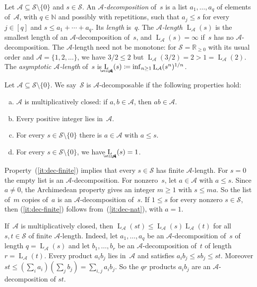 \documentclass[11pt,letterpaper]{article}
\DeclareMathOperator{\declength}{L}
\DeclareMathOperator{\asympdeclength}{\underaccent{\wtilde}{L}}
\newcommand{\RR}{\mathbb{R}}
\newcommand{\NN}{\mathbb{N}}
\begin{document}
Let $\mathcal{A} \subseteq \mathcal{S} \setminus \{0\}$ and $s \in \mathcal{S}$. An \emph{$\mathcal{A}$-decomposition} of~$s$ is a list $a_1, \ldots, a_q$ of elements of~$\mathcal{A}$, with $q \in \NN$ and possibly with repetitions, such that $a_j \leq s$ for every $j \in [q]$ and $s \leq a_1 + \cdots + a_q$. Its \emph{length} is~$q$. The \emph{$\mathcal{A}$-length} $\declength_{\mathcal{A}}(s)$ is the smallest length of an $\mathcal{A}$-decomposition of~$s$, and $\declength_{\mathcal{A}}(s) = \infty$ if~$s$ has no $\mathcal{A}$-decomposition. The $\mathcal{A}$-length need not be monotone: for $\mathcal{S} = \RR_{\geq0}$ with its usual order and $\mathcal{A} = \{1, 2, \ldots\}$, we have $3/2 \leq 2$ but $\declength_{\mathcal{A}}(3/2) = 2 > 1 = \declength_{\mathcal{A}}(2)$. The \emph{asymptotic $\mathcal{A}$-length} of~$s$ is $\asympdeclength_{\mathcal{A}}(s) \coloneqq \inf_{n \geq 1} \declength_{\mathcal{A}}(s^n)^{1/n}$.

\begin{definition}\label{def:decomposable}
Let $\mathcal{A} \subseteq \mathcal{S} \setminus \{0\}$.
We say~$\mathcal{S}$ is $\mathcal{A}$-decomposable if the following properties hold:
\begin{enumerate}[(a)]
\item\label{it:dec-mult} $\mathcal{A}$ is multiplicatively closed: if $a,b \in \mathcal{A}$, then $ab \in \mathcal{A}$.
\item\label{it:dec-nat} Every positive integer lies in~$\mathcal{A}$.
\item\label{it:dec-finite} For every $s \in \mathcal{S} \setminus \{0\}$ there is $a \in \mathcal{A}$ with $a \leq s$.
\item\label{it:dec-count} For every $s \in \mathcal{S} \setminus \{0\}$, we have $\asympdeclength_{\mathcal{A}}(s) = 1$.
\end{enumerate}
\end{definition}

Property~(\ref{it:dec-finite}) implies that every $s \in \mathcal{S}$ has finite $\mathcal{A}$-length. For $s = 0$ the empty list is an $\mathcal{A}$-decomposition. For nonzero~$s$, let $a \in \mathcal{A}$ with $a \leq s$. Since $a \neq 0$, the Archimedean property gives an integer $m \geq 1$ with $s \leq ma$. So the list of~$m$ copies of~$a$ is an $\mathcal{A}$-decomposition of~$s$. If $1 \leq s$ for every nonzero $s \in \mathcal{S}$, then (\ref{it:dec-finite}) follows from~(\ref{it:dec-nat}), with $a = 1$.

If~$\mathcal{A}$ is multiplicatively closed, then $\declength_{\mathcal{A}}(st) \leq \declength_{\mathcal{A}}(s) \declength_{\mathcal{A}}(t)$ for all $s, t \in \mathcal{S}$ of finite $\mathcal{A}$-length. Indeed, let $a_1, \ldots, a_q$ be an $\mathcal{A}$-decomposition of~$s$ of length $q = \declength_{\mathcal{A}}(s)$ and let $b_1, \ldots, b_r$ be an $\mathcal{A}$-decomposition of~$t$ of length $r = \declength_{\mathcal{A}}(t)$. Every product $a_i b_j$ lies in~$\mathcal{A}$ and satisfies $a_i b_j \leq s b_j \leq st$. Moreover $st \leq (\sum_i a_i)(\sum_j b_j) = \sum_{i,j} a_i b_j$. So the $qr$ products $a_i b_j$ are an $\mathcal{A}$-decomposition of $st$.
\end{document}
